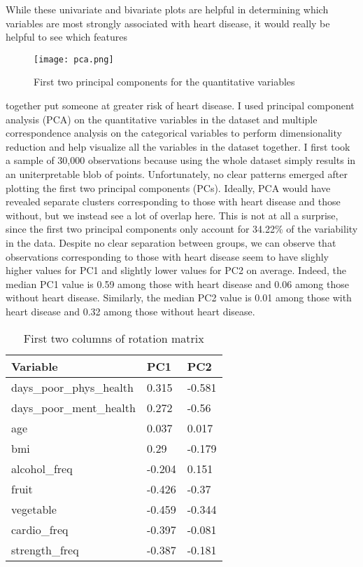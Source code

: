 \documentclass[12pt]{article}
\begin{document}
While these univariate and bivariate plots are helpful in determining which variables are most strongly associated with heart disease, it would really be helpful to see which features
\begin{wrapfigure}[20]{r}{0.65\textwidth}
\centering
\texttt{[image: pca.png]} 
\caption{\centering First two principal components for the quantitative variables}
\label{pca}
\end{wrapfigure}%
together put someone at greater risk of heart disease. I used principal component analysis (PCA) on the quantitative variables in the dataset and multiple correspondence analysis on the categorical variables to perform dimensionality reduction and help visualize all the variables in the dataset together. I first took a sample of 30,000 observations because using the whole dataset simply results in an uniterpretable blob of points. Unfortunately, no clear patterns emerged after plotting the first two principal components (PCs). Ideally, PCA would have revealed separate clusters corresponding to those with heart disease and those without, but we instead see a lot of overlap here. This is not at all a surprise, since the first two principal components only account for 34.22\% of the variability in the data. Despite no clear separation between groups, we can observe that observations corresponding to those with heart disease seem to have slighly higher values for PC1 and slightly lower values for PC2 on average. Indeed, the median PC1 value is 0.59 among those with heart disease and 0.06 among those without heart disease. Similarly, the median PC2 value is 0.01 among those with heart disease and 0.32 among those without heart disease.


\begin{table}[!ht]
    \centering
    \begin{tabular}{l|l|l}
        Variable & PC1 & PC2 \\ \hline
        days\_poor\_phys\_health & 0.315 & -0.581 \\ 
        days\_poor\_ment\_health & 0.272 & -0.56 \\ 
        age & 0.037 & 0.017 \\ 
        bmi & 0.29 & -0.179 \\ 
        alcohol\_freq & -0.204 & 0.151 \\ 
        fruit & -0.426 & -0.37 \\ 
        vegetable & -0.459 & -0.344 \\ 
        cardio\_freq & -0.397 & -0.081 \\ 
        strength\_freq & -0.387 & -0.181 \\ 
    \end{tabular}
    \caption{First two columns of rotation matrix}
    \label{mca}
\end{table}
\end{document}
